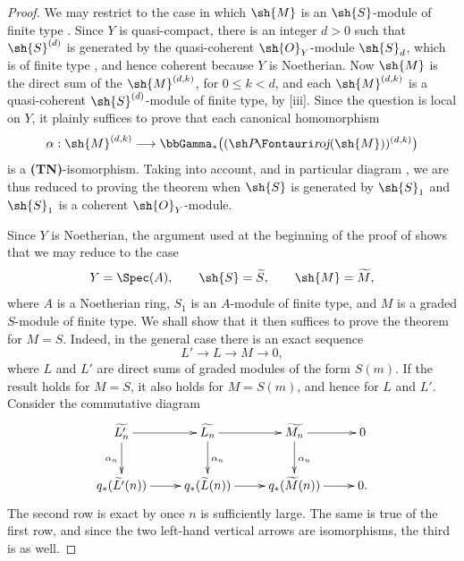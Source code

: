 \begin{proof}
We may restrict to the case in which $\sh{M}$ is an $\sh{S}$-module of finite type .
Since $Y$ is quasi-compact, there is an integer $d>0$ such that $\sh{S}^{(d)}$ is generated by the quasi-coherent $\sh{O}_Y$-module $\sh{S}_d$, which is of finite type , and hence coherent because $Y$ is Noetherian.
Now $\sh{M}$ is the direct sum of the $\sh{M}^{(d,k)}$, for $0\leq k<d$, and each $\sh{M}^{(d,k)}$ is a quasi-coherent $\sh{S}^{(d)}$-module of finite type, by [iii].
Since the question is local on $Y$, it plainly suffices to prove that each canonical homomorphism
\[
  \alpha:\sh{M}^{(d,k)}
  \longrightarrow
  \bbGamma_*\bigl((\shProj(\sh{M}))^{(d,k)}\bigr)
\]
is a \textbf{(TN)}-isomorphism.
Taking  into account, and in particular diagram , we are thus reduced to proving the theorem when $\sh{S}$ is generated by $\sh{S}_1$ and $\sh{S}_1$ is a coherent $\sh{O}_Y$-module.

Since $Y$ is Noetherian, the argument used at the beginning of the proof of  shows that we may reduce to the case
\[
  Y=\Spec(A),\qquad
  \sh{S}=\widetilde{S},\qquad
  \sh{M}=\widetilde{M},
\]
where $A$ is a Noetherian ring, $S_1$ is an $A$-module of finite type, and $M$ is a graded $S$-module of finite type.
We shall show that it then suffices to prove the theorem for $M=S$.
Indeed, in the general case there is an exact sequence
\[
  L'\longrightarrow L\longrightarrow M\longrightarrow0,
\]
where $L$ and $L'$ are direct sums of graded modules of the form $S(m)$.
If the result holds for $M=S$, it also holds for $M=S(m)$, and hence for $L$ and $L'$.
Consider the commutative diagram
\[
  \xymatrix{
    \widetilde{L'_n}\ar[r]\ar[d]_{\alpha_n} &
    \widetilde{L_n}\ar[r]\ar[d]^{\alpha_n} &
    \widetilde{M_n}\ar[r]\ar[d]^{\alpha_n} &
    0\\
    q_*(\widetilde{L'}(n))\ar[r] &
    q_*(\widetilde{L}(n))\ar[r] &
    q_*(\widetilde{M}(n))\ar[r] &
    0 .
  }
\]
The second row is exact by  once $n$ is sufficiently large.
The same is true of the first row, and since the two left-hand vertical arrows are isomorphisms, the third is as well.


\end{proof}

